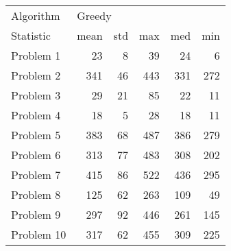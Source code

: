\begin{tabular}{lrrrrr}
\toprule
Algorithm & \multicolumn{5}{l}{Greedy} \\
Statistic &   mean & std &  max &  med &  min \\
\midrule
Problem 1  &     23 &   8 &   39 &   24 &    6 \\
Problem 2  &    341 &  46 &  443 &  331 &  272 \\
Problem 3  &     29 &  21 &   85 &   22 &   11 \\
Problem 4  &     18 &   5 &   28 &   18 &   11 \\
Problem 5  &    383 &  68 &  487 &  386 &  279 \\
Problem 6  &    313 &  77 &  483 &  308 &  202 \\
Problem 7  &    415 &  86 &  522 &  436 &  295 \\
Problem 8  &    125 &  62 &  263 &  109 &   49 \\
Problem 9  &    297 &  92 &  446 &  261 &  145 \\
Problem 10 &    317 &  62 &  455 &  309 &  225 \\
\bottomrule
\end{tabular}
